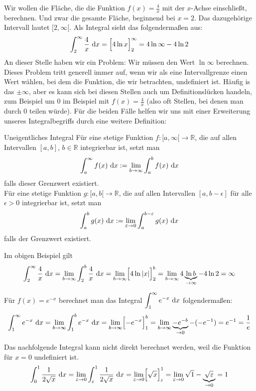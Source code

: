 \documentclass[../../main.tex]{subfiles}
\begin{document}
Wir wollen die Fläche, die die Funktion $f(x)=\frac{4}{x}$ mit der $x$-Achse einschließt, berechnen. Und zwar die 
gesamte Fläche, beginnend bei $x=2$. Das dazugehörige Intervall lautet $[2,\infty[$. Als Integral sieht das 
folgendermaßen aus:
\[\int_2^\infty \frac{4}{x}\mathop{}\mathrm{d} x=\Bigl[4\ln{x}\Bigr]_2^\infty=4\ln{\infty}-4\ln{2}\]
An dieser Stelle haben wir ein Problem: Wir müssen den Wert $\ln{\infty}$ berechnen. Dieses Problem tritt generell 
immer auf, wenn wir als eine Intervallgrenze einen Wert wählen, bei dem die Funktion, die wir betrachten, undefiniert 
ist. Häufig is das $\pm\infty$, aber es kann sich bei diesen Stellen auch um Definitionslücken handeln, zum Beispiel 
um 0 im Beispiel mit $f(x)=\frac{4}{x}$ (also oft Stellen, bei denen man durch 0 teilen würde). Für die beiden Fälle 
helfen wir uns mit einer Erweiterung unseres Integralbegriffs durch eine weitere Definition:
\begin{definition}{Uneigentliches Integral}
Für eine stetige Funktion $f:[a,\infty[\rightarrow\mathbb{R}$, die auf allen Intervallen $[a,b]$, $b\in\mathbb{R}$ 
integrierbar ist, setzt man
\[\int_a^\infty f(x)\mathop{}\mathrm{d} x:=\lim\limits_{b\rightarrow\infty}\int_a^b f(x)\mathop{}\mathrm{d} x\]
falls dieser Grenzwert existiert.\\

Für eine stetige Funktion $g:[a,b[\rightarrow\mathbb{R}$, die auf allen Intervallen $[a,b-\epsilon]$ für alle 
$\epsilon>0$ integrierbar ist, setzt man
\[\int_a^b g(x)\mathop{}\mathrm{d} x:=\lim\limits_{\varepsilon\rightarrow 0}\int_a^{b-\varepsilon} g(x)\mathop{}\mathrm{d} x\]
falls der Grenzwert existiert.
\end{definition}
\begin{example}{}
Im obigen Beispiel gilt \[\int_2^\infty \frac{4}{x}\mathop{}\mathrm{d} x=\lim\limits_{b\rightarrow\infty}\int_2^b \frac{4}{x}\mathop{}\mathrm{d} x=\lim\limits_{b\rightarrow\infty}\Bigl[4\ln{|x|}\Bigr]_2^b=\lim\limits_{b\rightarrow\infty}4\underbrace{\ln{b}}_{\rightarrow\infty}-4\ln{2}=\infty\]
\end{example}
\begin{example}{}
Für $f(x)=e^{-x}$ berechnet man das Integral $\displaystyle\int_1^\infty e^{-x}\mathop{}\mathrm{d} x$ folgendermaßen: 
\[\int_1^\infty e^{-x}\mathop{}\mathrm{d} x=\lim\limits_{b\rightarrow\infty}\int_1^b e^{-x}\mathop{}\mathrm{d} x=\lim\limits_{b\rightarrow\infty}\Bigl[-e^{-x}\Bigr]_1^b=\lim\limits_{b\rightarrow\infty}\underbrace{-e^{-b}}_{\rightarrow 0}-(-e^{-1})=e^{-1}=\frac{1}{e}\]
\end{example}
\begin{example}{}
Das nachfolgende Integral kann nicht direkt berechnet werden, weil die Funktion für $x=0$ undefiniert ist.
\[\int_0^1\frac{1}{2\sqrt{x}}\mathop{}\mathrm{d} x=\lim\limits_{\varepsilon\rightarrow 0}\int_\varepsilon^1 \frac{1}{2\sqrt{x}}\mathop{}\mathrm{d} x=\lim\limits_{\varepsilon\rightarrow 0}\Bigl[\sqrt{x}\Bigr]_\varepsilon^1=\lim\limits_{\varepsilon\rightarrow 0}\sqrt{1}-\underbrace{\sqrt{\varepsilon}}_{\rightarrow 0}=1\]
\end{example}
\end{document}
